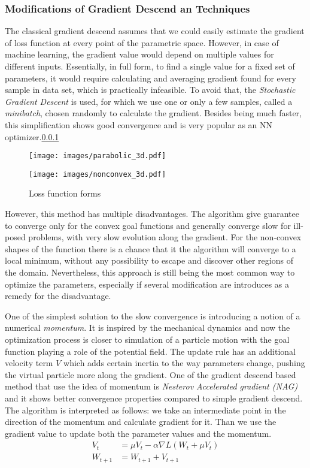 \subsubsection{Modifications of Gradient Descend an Techniques}

The classical gradient descend assumes that we could easily estimate the gradient of loss function at every point of the parametric space.
However, in case of machine learning, the gradient value would depend on multiple values for different inputs.
Essentially, in full form, to find a single value for a fixed set of parameters, it would require calculating and averaging gradient found for every sample in data set, which is practically infeasible.
To avoid that, the \textit{Stochastic Gradient Descent} is used, for which we use one or only a few samples, called a \textit{minibatch}, chosen randomly to calculate the gradient.
Besides being much faster, this simplification shows good convergence and is very popular as an NN optimizer.\ref{}

\begin{figure*}
	\begin{multicols}{2}
		\texttt{[image: images/parabolic\_3d.pdf]}\par
		\texttt{[image: images/nonconvex\_3d.pdf]}\par
	\end{multicols}
	\caption{Loss function forms}
	\label{fig:lossfunc_demo}
\end{figure*}
	
However, this method has multiple disadvantages.
The algorithm give guarantee to converge only for the convex goal functions and generally converge slow for ill-posed problems, with very slow evolution along the gradient.
For the non-convex shapes of the function there is a chance that it the algorithm will converge to a local minimum, without any possibility to escape and discover other regions of the domain.
Nevertheless, this approach is still being the most common way to optimize the parameters, especially if several modification are introduces as a remedy for the disadvantage.
\medskip

One of the simplest solution to the slow convergence is introducing a notion of a numerical \textit{momentum}.
It is inspired by the mechanical dynamics and now the optimization process is closer to simulation of a particle motion with the goal function playing a role of the potential field.
The update rule has an additional velocity term $V$ which adds certain inertia to the way parameters change, pushing the virtual particle more along the gradient. 
One of the gradient descend based method that use the idea of momentum is \textit{Nesterov Accelerated gradient (NAG)} and it shows better convergence properties compared to simple gradient descend.
The algorithm is interpreted as follows: 
we take an intermediate point in the direction of the momentum and calculate gradient for it.
Than we use the gradient value to update both the parameter values and the momentum.
\begin{align*}
	V_{t} & =\mu V_{t} - \alpha \nabla L (W_{t}+\mu V_{t}) \\
	W_{t+1} & = W_{t+1} + V_{t+1}
\end{align*}

